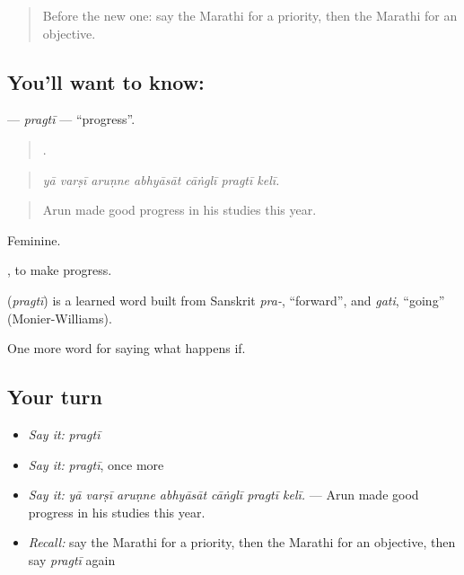 \label{lesson:MR-C388-pragti}



\begin{quote}
Before the new one: say the Marathi for a priority, then the Marathi for an objective.
\end{quote}

\subsection*{You'll want to know: }
\textbf{} — \emph{pragtī} — \textquotedblleft{}progress\textquotedblright{}.

\begin{quote}
      .
\end{quote}

\begin{quote}
\emph{yā varṣī aruṇne abhyāsāt cāṅglī pragtī kelī.}
\end{quote}

\begin{quote}
Arun made good progress in his studies this year.
\end{quote}

Feminine.

 , to make progress.

\begin{cousinweb}
\textbf{} (\emph{pragtī}) is a learned word built from Sanskrit \emph{pra-}, \textquotedblleft{}forward\textquotedblright{}, and \emph{gati}, \textquotedblleft{}going\textquotedblright{} (Monier-Williams).
\end{cousinweb}

\begin{grammarlens}[title={What you've built}]
One more word for saying what happens if.
\end{grammarlens}

\subsection*{Your turn}
\begin{itemize}
\raggedright
  \item \emph{Say it:} \emph{pragtī}
  \item \emph{Say it:} \emph{pragtī}, once more
  \item \emph{Say it:} \emph{yā varṣī aruṇne abhyāsāt cāṅglī pragtī kelī.} — Arun made good progress in his studies this year.
  \item \emph{Recall:} say the Marathi for a priority, then the Marathi for an objective, then say \emph{pragtī} again
\end{itemize}

